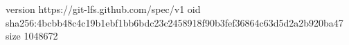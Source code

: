 version https://git-lfs.github.com/spec/v1
oid sha256:4bcbb48c4c19b1ebf1bb6bdc23c2458918f90b3fef36864c63d5d2a2b920ba47
size 1048672
